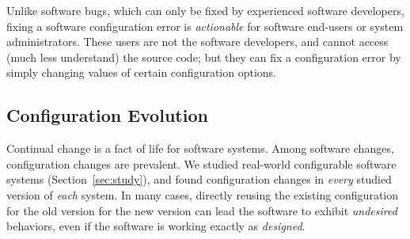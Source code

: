 Unlike software bugs,
which can only be fixed by experienced software developers, fixing a software
configuration error is \textit{actionable} for software end-users
or system administrators. These users are not the software developers,
and cannot access (much less understand)
the source code;  but they can fix a configuration error by simply changing
values of certain configuration options.


\vspace{-1mm}
\subsection{Configuration Evolution}
\label{sec:evolerror}

Continual change is a fact of life for software systems.
Among software changes, configuration changes are prevalent.
We studied \studysubjnum real-world configurable software
systems (Section~\ref{sec:study}), and
found configuration changes in \textit{every} studied
version of \textit{each} system. In many 
cases, directly reusing the existing configuration
for the old version for the new
version can lead the software to exhibit \textit{undesired} behaviors,
even if the software is working exactly as \textit{designed}.







